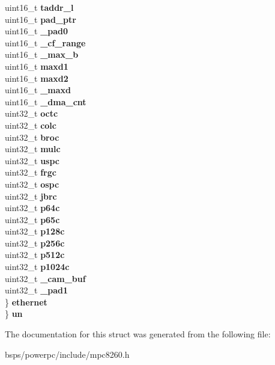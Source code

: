 \begin{DoxyCompactItemize}
\begin{tabbing}
\>\>uint16\_t {\bfseries taddr\_l}\\
\>\>uint16\_t {\bfseries pad\_ptr}\\
\>\>uint16\_t {\bfseries \_pad0}\\
\>\>uint16\_t {\bfseries \_cf\_range}\\
\>\>uint16\_t {\bfseries \_max\_b}\\
\>\>uint16\_t {\bfseries maxd1}\\
\>\>uint16\_t {\bfseries maxd2}\\
\>\>uint16\_t {\bfseries \_maxd}\\
\>\>uint16\_t {\bfseries \_dma\_cnt}\\
\>\>uint32\_t {\bfseries octc}\\
\>\>uint32\_t {\bfseries colc}\\
\>\>uint32\_t {\bfseries broc}\\
\>\>uint32\_t {\bfseries mulc}\\
\>\>uint32\_t {\bfseries uspc}\\
\>\>uint32\_t {\bfseries frgc}\\
\>\>uint32\_t {\bfseries ospc}\\
\>\>uint32\_t {\bfseries jbrc}\\
\>\>uint32\_t {\bfseries p64c}\\
\>\>uint32\_t {\bfseries p65c}\\
\>\>uint32\_t {\bfseries p128c}\\
\>\>uint32\_t {\bfseries p256c}\\
\>\>uint32\_t {\bfseries p512c}\\
\>\>uint32\_t {\bfseries p1024c}\\
\>\>uint32\_t {\bfseries \_cam\_buf}\\
\>\>uint32\_t {\bfseries \_pad1}\\
\>\} {\bfseries ethernet}\\
\} {\bfseries un}\\

\end{tabbing}\end{DoxyCompactItemize}


The documentation for this struct was generated from the following file\+:\begin{DoxyCompactItemize}
\item 
bsps/powerpc/include/mpc8260.\+h\end{DoxyCompactItemize}

